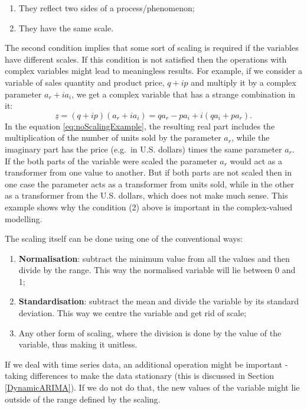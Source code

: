 \documentclass[
]{book}
\providecommand{\tightlist}{%
  \setlength{\itemsep}{0pt}\setlength{\parskip}{0pt}}
\begin{document}
\begin{enumerate}
\def\labelenumi{\arabic{enumi}.}
\tightlist
\item
  They reflect two sides of a process/phenomenon;
\item
  They have the same scale.
\end{enumerate}

The second condition implies that some sort of scaling is required if the variables have different scales. If this condition is not satisfied then the operations with complex variables might lead to meaningless results. For example, if we consider a variable of sales quantity and product price, \(q + ip\) and multiply it by a complex parameter \(a_r + i a_i\), we get a complex variable that has a strange combination in it:
\begin{equation}
    \underline{z} = (q + ip) (a_r + i a_i) = q a_r - p a_i + i(q a_i + p a_r).
    \label{eq:noScalingExample}
\end{equation}
In the equation \eqref{eq:noScalingExample}, the resulting real part includes the multiplication of the number of units sold by the parameter \(a_r\), while the imaginary part has the price (e.g.~in U.S. dollars) times the same parameter \(a_r\). If the both parts of the variable were scaled the parameter \(a_r\) would act as a transformer from one value to another. But if both parts are not scaled then in one case the parameter acts as a transformer from units sold, while in the other as a transformer from the U.S. dollars, which does not make much sense. This example shows why the condition (2) above is important in the complex-valued modelling.

The scaling itself can be done using one of the conventional ways:

\begin{enumerate}
\def\labelenumi{\alph{enumi}.}
\tightlist
\item
  \textbf{Normalisation}: subtract the minimum value from all the values and then divide by the range. This way the normalised variable will lie between 0 and 1;
\item
  \textbf{Standardisation}: subtract the mean and divide the variable by its standard deviation. This way we centre the variable and get rid of scale;
\item
  Any other form of scaling, where the division is done by the value of the variable, thus making it unitless.
\end{enumerate}

If we deal with time series data, an additional operation might be important - taking differences to make the data stationary (this is discussed in Section \ref{DynamicARIMA}). If we do not do that, the new values of the variable might lie outside of the range defined by the scaling.
\end{document}
